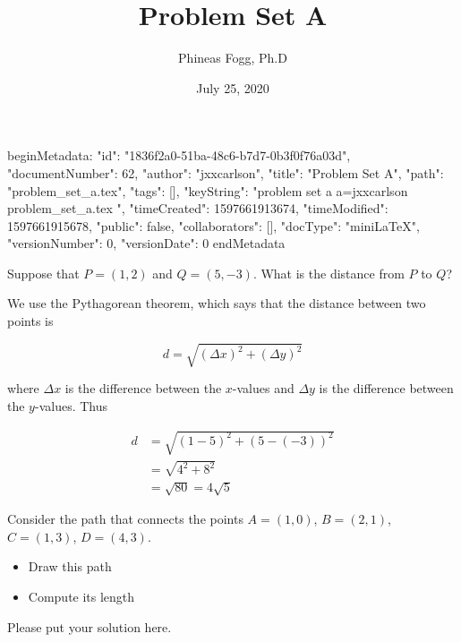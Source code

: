beginMetadata:
{
    "id": "1836f2a0-51ba-48c6-b7d7-0b3f0f76a03d",
    "documentNumber": 62,
    "author": "jxxcarlson",
    "title": "Problem Set A",
    "path": "problem_set_a.tex",
    "tags": [],
    "keyString": "problem set a a=jxxcarlson problem_set_a.tex ",
    "timeCreated": 1597661913674,
    "timeModified": 1597661915678,
    "public": false,
    "collaborators": [],
    "docType": "miniLaTeX",
    "versionNumber": 0,
    "versionDate": 0
}
endMetadata
\title{Problem Set A}
\author{Phineas Fogg, Ph.D}
\date{July 25, 2020}


\maketitle


\begin{problem}
Suppose that $P = (1,2)$ and $Q = (5,-3)$.  What is the distance from $P$ to $Q$?
\end{problem}

\begin{solution}
We use the Pythagorean theorem, which says that the distance between two points is

\begin{equation}
d = \sqrt{(\Delta x)^2 + (\Delta y)^2}
\end{equation}

where $\Delta x$ is the difference between the $x$-values and $\Delta y$ is the difference between the $y$-values.  Thus

\begin{align}
d &= \sqrt{(1 - 5)^2 + (5 - (-3))^2} \\
  &= \sqrt{4^2 + 8^2} \\
  &= \sqrt{80} = 4\sqrt{5}
\end{align}

\end{solution}

\begin{problem}
Consider the path that connects the points $A = (1,0)$,
$B = (2,1)$, $C = (1,3)$, $D = (4,3)$.

\medskip
\begin{itemize}
\item Draw this path
\item Compute its length
\end{itemize}
\end{problem}

\begin{solution}
Please put your solution here.
\end{solution}

